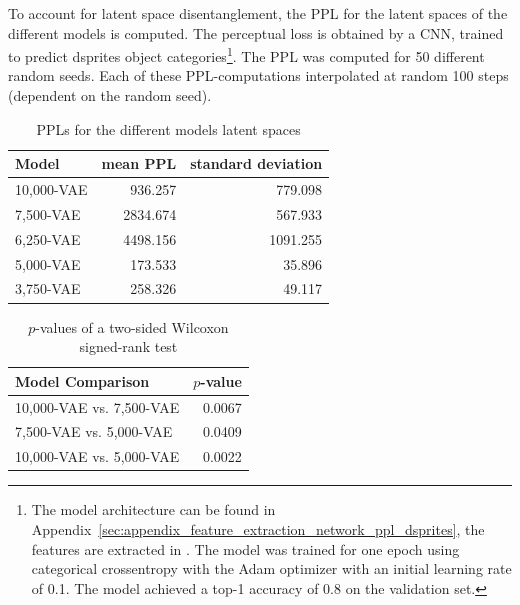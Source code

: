 To account for latent space disentanglement, the \ac{PPL} for the latent spaces of the different models is computed.
The perceptual loss is obtained by a \ac{CNN}, trained to predict dsprites object categories\footnote{The model architecture can be found in Appendix~\ref{sec:appendix_feature_extraction_network_ppl_dsprites}, the features are extracted in . The model was trained for one epoch using categorical crossentropy with the Adam optimizer with an initial learning rate of 0.1. The model achieved a top-1 accuracy of 0.8 on the validation set.}.
The \ac{PPL} was computed for 50 different random seeds.
Each of these \ac{PPL}-computations interpolated at random 100 steps (dependent on the random seed).

\begin{table}
    \centering
    \begin{tabular}{lrr}
        \toprule
        Model           & mean \ac{PPL} & standard deviation \\
        \midrule
        10,000-\ac{VAE} & 936.257       & 779.098            \\
        7,500-\ac{VAE}  & 2834.674      & 567.933            \\
        6,250-\ac{VAE}  & 4498.156      & 1091.255           \\
        5,000-\ac{VAE}  & 173.533       & 35.896             \\
        3,750-\ac{VAE}  & 258.326       & 49.117             \\
        \bottomrule
    \end{tabular}
    \caption{\acfp{PPL} for the different models latent spaces}
    \label{tab:ppl-dsprites}
\end{table}

\begin{table}
    \centering
    \begin{tabular}{lr}
        \toprule
        Model Comparison                   & $p$-value \\
        \midrule
        10,000-\ac{VAE} vs. 7,500-\ac{VAE} & 0.0067    \\
        7,500-\ac{VAE} vs. 5,000-\ac{VAE}  & 0.0409    \\
        10,000-\ac{VAE} vs. 5,000-\ac{VAE} & 0.0022    \\
        \bottomrule
    \end{tabular}
    \caption{$p$-values of a two-sided Wilcoxon signed-rank test}
    \label{tab:ppl-dsprites-p-values}
\end{table}

